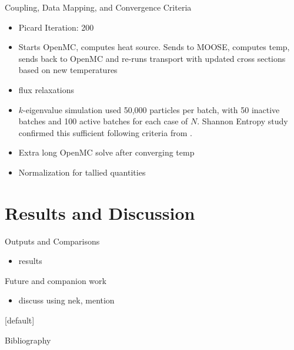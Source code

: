 \documentclass[9pt,t]{beamer}
\makeatletter
\newenvironment{withoutheadline}{
       \setbeamertemplate{headline}[default]
       \def\beamer@entrycode{\vspace*{-\headheight}}
    }{}
\makeatother
\begin{document}
\begin{frame}{Coupling, Data Mapping, and Convergence Criteria}
    \begin{itemize}
        \item Picard Iteration: 200
        \item Starts OpenMC, computes heat source. Sends to MOOSE, computes temp, sends back to OpenMC and re-runs transport with updated cross sections based on new temperatures
        \item flux relaxations \cite{dufek}
        \item $k$-eigenvalue simulation used 50,000 particles per batch, with 50 inactive batches and 100 active batches for each case of $N$. Shannon Entropy study confirmed this sufficient following criteria from \cite{brown-entropy-2006}.
        \item Extra long OpenMC solve after converging temp
        \item Normalization for tallied quantities
    \end{itemize}
\end{frame}


\section{Results and Discussion}
\begin{frame}{Outputs and Comparisons}
    \begin{itemize}
        \item results
    \end{itemize}
\end{frame}

\begin{frame}{Future and companion work}
    \begin{itemize}
        \item discuss using nek, mention \cite{aya2023}
    \end{itemize}
\end{frame}


\begin{withoutheadline}
\begin{frame}[allowframebreaks]{Bibliography}
    \printbibliography
\end{frame}
\end{withoutheadline}
\end{document}
